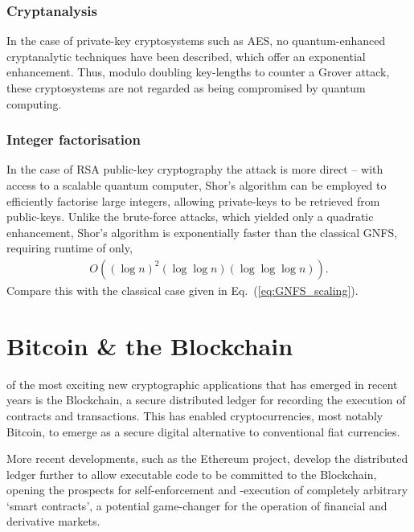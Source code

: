 %
%

\subsubsection{Cryptanalysis}

In the case of private-key cryptosystems such as AES, no quantum-enhanced cryptanalytic techniques have been described, which offer an exponential enhancement. Thus, modulo doubling key-lengths to counter a Grover attack, these cryptosystems are not regarded as being compromised by quantum computing.

%
%

\subsubsection{Integer factorisation}

In the case of RSA public-key cryptography the attack is more direct -- with access to a scalable quantum computer, Shor's algorithm can be employed to efficiently factorise large integers, allowing private-keys to be retrieved from public-keys. Unlike the brute-force attacks, which yielded only a quadratic enhancement, Shor's algorithm is exponentially faster than the classical GNFS, requiring runtime of only,
\begin{align}
	O((\log n)^2(\log\log n)(\log\log\log n)).
\end{align}
Compare this with the classical case given in Eq.~(\ref{eq:GNFS_scaling}).

%
%

\section{Bitcoin \& the Blockchain}\label{sec:bitcoin_blockchain}

 of the most exciting new cryptographic applications that has emerged in recent years is the Blockchain, a secure distributed ledger for recording the execution of contracts and transactions. This has enabled cryptocurrencies, most notably Bitcoin, to emerge as a secure digital alternative to conventional fiat currencies.

More recent developments, such as the Ethereum project, develop the distributed ledger further to allow executable code to be committed to the Blockchain, opening the prospects for self-enforcement and -execution of completely arbitrary `smart contracts', a potential game-changer for the operation of financial and derivative markets.

